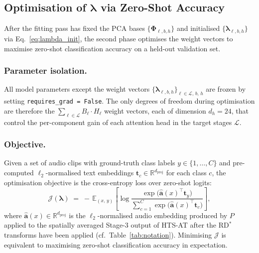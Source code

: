 \subsection{Optimisation of $\boldsymbol{\lambda}$ via Zero-Shot Accuracy}
\label{app:optim}

After the fitting pass has fixed the PCA bases
$\{\boldsymbol{\Phi}_{\ell,b,h}\}$ and initialised
$\{\boldsymbol{\lambda}_{\ell,b,h}\}$ via Eq.~\eqref{eq:lambda_init},
the second phase optimises the weight vectors to maximise zero-shot
classification accuracy on a held-out validation set.

\subsubsection{Parameter isolation.}
All model parameters except the weight vectors
$\{\boldsymbol{\lambda}_{\ell,b,h}\}_{\ell \in \mathcal{L},\,b,\,h}$
are frozen by setting \texttt{requires\_grad = False}. The only degrees
of freedom during optimisation are therefore the
$\sum_{\ell \in \mathcal{L}} B_\ell \cdot H_\ell$ weight vectors, each
of dimension $d_h = 24$, that control the per-component gain of each
attention head in the target stages $\mathcal{L}$.

\subsubsection{Objective.}
Given a set of audio clips with ground-truth class labels
$y \in \{1,\ldots,C\}$ and pre-computed $\ell_2$-normalised text
embeddings $\mathbf{t}_c \in \mathbb{R}^{d_{\mathrm{proj}}}$ for each
class $c$, the optimisation objective is the cross-entropy loss over
zero-shot logits:
\begin{equation}
    \mathcal{J}(\boldsymbol{\lambda})
    \;=\;
    -\,\mathbb{E}_{(x,\,y)}\!\left[
        \log \frac{
            \exp\!\bigl(\hat{\mathbf{a}}(x)^\top \mathbf{t}_y\bigr)
        }{
            \displaystyle\sum_{c=1}^{C}
            \exp\!\bigl(\hat{\mathbf{a}}(x)^\top \mathbf{t}_c\bigr)
        }
    \right],
    \label{eq:optim_obj}
\end{equation}
where $\hat{\mathbf{a}}(x) \in \mathbb{R}^{d_{\mathrm{proj}}}$ is the
$\ell_2$-normalised audio embedding produced by $P$ applied to the
spatially averaged Stage-3 output of HTS-AT after the RD$^*$\xspace
transforms have been applied (cf.\ Table~\ref{tab:notation}).
Minimising $\mathcal{J}$ is equivalent to maximising zero-shot
classification accuracy in expectation.

